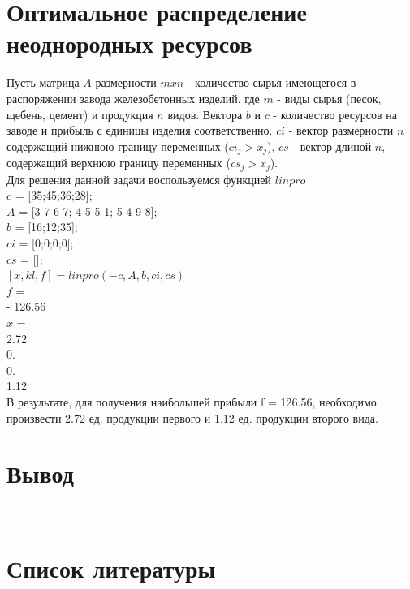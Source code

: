\documentclass[russian, utf8, nocolumnxxxi, nocolumnxxxii, 14pt]{eskdtext}
\begin{document}
\section{Оптимальное распределение неоднородных ресурсов}
\indent Пусть матрица $A$ размерности $mxn$ - количество сырья имеющегося в распоряжении завода железобетонных изделий, где $m$ - виды сырья (песок, щебень, цемент) и продукция $n$ видов. Вектора $b$ и $c$ - количество ресурсов на заводе и прибыль $с$ единицы изделия соответственно. $ci$ - вектор размерности $n$ содержащий нижнюю границу переменных ($ci_j > x_j$), $cs$ - вектор длиной $n$, содержащий верхнюю границу переменных ($cs_j > x_j$).\\
Для решения данной задачи воспользуемся функцией $linpro$\\
$c$ = [35;45;36;28];\\
$A$ = [3 7 6 7; 4 5 5 1; 5 4 9 8];\\
$b$ = [16;12;35];\\
$ci$ = [0;0;0;0];\\
$cs$ = [];\\
$[x,kl,f]=linpro(-c,A,b,ci,cs)$\\
$f$  =\\
- 126.56 \\
$x$  =\\
2.72\\
0.\\
0.\\
1.12\\
\indent В результате, для получения наибольшей прибыли f = 126.56, необходимо произвести 2.72 ед. продукции первого и 1.12 ед. продукции второго вида.\\
\newpage
\section{Вывод}\\
\newpage
\section{Список литературы}\\
\end{document}
